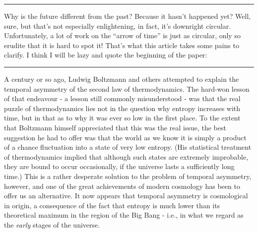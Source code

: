 \documentclass{article}
\def\tightlist{}
\renewcommand{\texttt}[1]{%
  \begingroup
  \ttfamily
  \begingroup\lccode`~=`/\lowercase{\endgroup\def~}{/\discretionary{}{}{}}%
  \begingroup\lccode`~=`[\lowercase{\endgroup\def~}{[\discretionary{}{}{}}%
  \begingroup\lccode`~=`.\lowercase{\endgroup\def~}{.\discretionary{}{}{}}%
  \catcode`/=\active\catcode`[=\active\catcode`.=\active
  \scantokens{#1\noexpand}%
  \endgroup
}
\begin{document}
\begin{center}\rule{0.5\linewidth}{0.5pt}\end{center}


Why is the future different from the past? Because it hasn't happened
yet? Well, sure, but that's not especially enlightening, in fact, it's
downright circular. Unfortunately, a lot of work on the ``arrow of
time'' is just as circular, only so erudite that it is hard to spot it!
That's what this article takes some pains to clarify. I think I will be
lazy and quote the beginning of the paper:

\begin{center}\rule{0.5\linewidth}{0.5pt}\end{center}

A century or so ago, Ludwig Boltzmann and others attempted to explain
the temporal asymmetry of the second law of thermodynamics. The hard-won
lesson of that endeavour - a lesson still commonly misunderstood - was
that the real puzzle of thermodynamics lies not in the question why
entropy increases with time, but in that as to why it was ever so low in
the first place. To the extent that Boltzmann himself appreciated that
this was the real issue, the best suggestion he had to offer was that
the world as we know it is simply a product of a chance fluctuation into
a state of very low entropy. (His statistical treatment of
thermodynamics implied that although such states are extremely
improbable, they are bound to occur occasionally, if the universe lasts
a sufficiently long time.) This is a rather desperate solution to the
problem of temporal asymmetry, however, and one of the great
achievements of modern cosmology has been to offer us an alternative. It
now appears that temporal asymmetry is cosmological in origin, a
consequence of the fact that entropy is much lower than its theoretical
maximum in the region of the Big Bang - i.e., in what we regard as the
\emph{early} stages of the universe.
\end{document}
